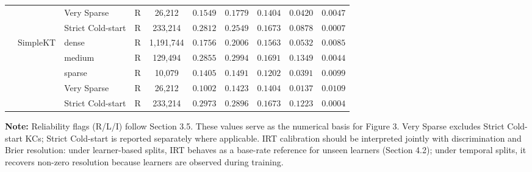 \begin{table}[htbp]
{\begin{tabular}{lllrcccccc}
 &  & Very Sparse & R & 26,212 & $0.1549$ & $0.1779$ & $0.1404$ & $0.0420$ & $0.0047$ \\
 &  & Strict Cold-start & R & 233,214 & $0.2812$ & $0.2549$ & $0.1673$ & $0.0878$ & $0.0007$ \\
 & SimpleKT & dense & R & 1,191,744 & $0.1756$ & $0.2006$ & $0.1563$ & $0.0532$ & $0.0085$ \\
 &  & medium & R & 129,494 & $0.2855$ & $0.2994$ & $0.1691$ & $0.1349$ & $0.0044$ \\
 &  & sparse & R & 10,079 & $0.1405$ & $0.1491$ & $0.1202$ & $0.0391$ & $0.0099$ \\
 &  & Very Sparse & R & 26,212 & $0.1002$ & $0.1423$ & $0.1404$ & $0.0137$ & $0.0109$ \\
 &  & Strict Cold-start & R & 233,214 & $0.2973$ & $0.2896$ & $0.1673$ & $0.1223$ & $0.0004$ \\
\bottomrule

\end{tabular}%
}

\vspace{1ex}
{\scriptsize \textbf{Note:} Reliability flags (R/L/I) follow Section 3.5. These values serve as the numerical basis for Figure 3. Very Sparse excludes Strict Cold-start KCs; Strict Cold-start is reported separately where applicable. IRT calibration should be interpreted jointly with discrimination and Brier resolution: under learner-based splits, IRT behaves as a base-rate reference for unseen learners (Section 4.2); under temporal splits, it recovers non-zero resolution because learners are observed during training.\par}

\end{table}
